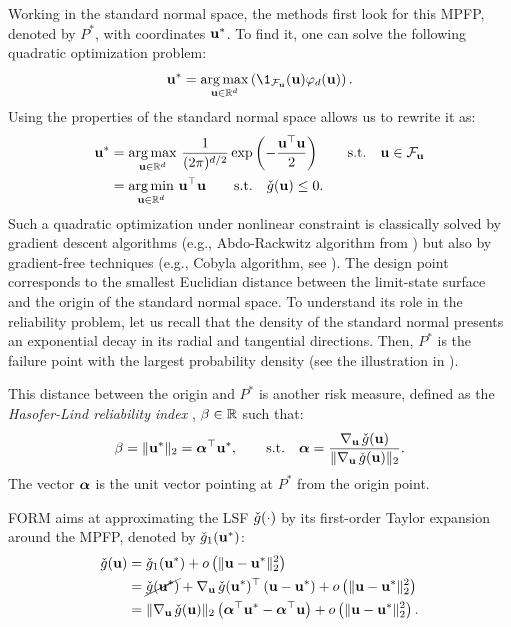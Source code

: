 Working in the standard normal space, the methods first look for this MPFP, denoted by $P^*$, with coordinates ${\bf u}^*$. 
To find it, one can solve the following quadratic optimization problem: 
\begin{equation}
    \bu^* = \argmax_{\bu \in \R^d} \left(\1_{\iF_\bu}(\bu) \varphi_d(\bu)\right).
\end{equation}
Using the properties of the standard normal space allows us to rewrite it as: 
\begin{align}
    {\bf u}^* &= \operatorname*{arg\,max}_{{\bf u} \in \mathbb{R}^d} \, \frac{1}{(2\pi)^{d/2}} \exp\left(-\frac{{\bf u}^\top {\bf u} }{2} \right) \qquad \mathrm{s.t.} \quad {\bf u} \in \mathcal{F}_{{\bf u}}\\
          &= \operatorname*{arg\,min}_{{\bf u} \in \mathbb{R}^d} \, {\bf u}^\top {\bf u} \qquad \mathrm{s.t.} \quad \check{g}({\bf u}) \leq 0.
\end{align}
Such a quadratic optimization under nonlinear constraint is classically solved by gradient descent algorithms (e.g., Abdo-Rackwitz algorithm from \citealp{abdo_rack_1991}) but also by gradient-free techniques (e.g., Cobyla algorithm, see \citealp{powell_1994}). 
The design point corresponds to the smallest Euclidian distance between the limit-state surface and the origin of the standard normal space. 
To understand its role in the reliability problem, let us recall that the density of the standard normal presents an exponential decay in its radial and tangential directions. 
Then, $P^*$ is the failure point with the largest probability density (see the illustration in ). 

This distance between the origin and $P^*$ is another risk measure, defined as the \textit{Hasofer-Lind reliability index} \citep{lemaire_2009}, $\beta \in \mathbb{R}$ such that:
\begin{equation}
    \beta = \Vert {\bf u}^* \Vert_2 = {\boldsymbol{\alpha}} ^\top {\bf u}^*, \qquad \mathrm{s.t.} \quad
        {\boldsymbol{\alpha}} = \frac{\nabla_{{\bf u}} \,  \check{g}({\bf u})}{\Vert \nabla_{{\bf u}} \,  \check{g}({\bf u}) \Vert_2}.      
\end{equation}
The vector ${\boldsymbol{\alpha}}$ is the unit vector pointing at $P^*$ from the origin point. 

FORM aims at approximating the LSF $\check{g}(\cdot)$ by its first-order Taylor expansion around the MPFP, denoted by $\check{g}_1({\bf u}^*)$: 
\begin{equation}
    \begin{split}
        \check{g}({\bf u}) &= \check{g}_1({\bf u}^*) + o\left(\Vert {\bf u} - {\bf u}^* \Vert_2^2\right)\\
                 &= \cancel{\check{g}({\bf u}^*)} + \nabla_{{\bf u}} \,  \check{g}({\bf u}^*)^\top \left({\bf u} -{\bf u}^* \right) + o\left(\Vert {\bf u} - {\bf u}^* \Vert_2^2\right)\\
                 &= \Vert \nabla_{{\bf u}} \, \check{g}({\bf u}) \Vert_2 \left({\boldsymbol{\alpha}}^\top {\bf u}^* - {\boldsymbol{\alpha}}^\top {\bf u} \right) + o\left(\Vert {\bf u} - {\bf u}^* \Vert_2^2\right).
    \end{split}    
\end{equation}
 
